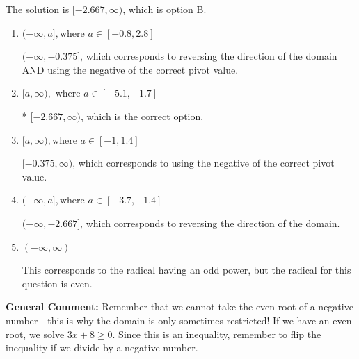 \documentclass{extbook}[14pt]
\begin{document}
\begin{enumerate}
{The solution is \( [-2.667, \infty) \), which is option B.\begin{enumerate}[label=\Alph*.]
\item \( (-\infty, a], \text{where } a \in [-0.8, 2.8] \)

$(-\infty, -0.375]$, which corresponds to reversing the direction of the domain AND using the negative of the correct pivot value.
\item \( [a, \infty), \text{ where } a \in [-5.1, -1.7] \)

* $[-2.667, \infty)$, which is the correct option.
\item \( [a, \infty), \text{where } a \in [-1, 1.4] \)

$[-0.375, \infty)$, which corresponds to using the negative of the correct pivot value.
\item \( (-\infty, a], \text{where } a \in [-3.7, -1.4] \)

 $(-\infty, -2.667]$, which corresponds to reversing the direction of the domain.
\item \( (-\infty, \infty) \)

This corresponds to the radical having an odd power, but the radical for this question is even.
\end{enumerate}

\textbf{General Comment:} Remember that we cannot take the even root of a negative number - this is why the domain is only sometimes restricted! If we have an even root, we solve $3 x + 8 \geq 0$. Since this is an inequality, remember to flip the inequality if we divide by a negative number.
}
\end{enumerate}
\end{document}
